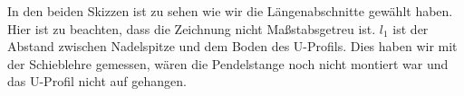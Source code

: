 \documentclass[twoside]{protokoll}
\begin{document}
\begin{figure}[H]
    \centering
    \hfill 
    \label{Pendel Aufbau}
\end{figure}
In den beiden Skizzen ist zu sehen wie wir die Längenabschnitte gewählt haben. 
Hier ist zu beachten, dass die Zeichnung nicht Maßstabsgetreu ist.
$l_1$ ist der Abstand zwischen Nadelspitze und dem Boden des U-Profils. 
Dies haben wir mit der Schieblehre gemessen, wären die Pendelstange noch nicht montiert war und das U-Profil nicht auf gehangen.\\
\end{document}
